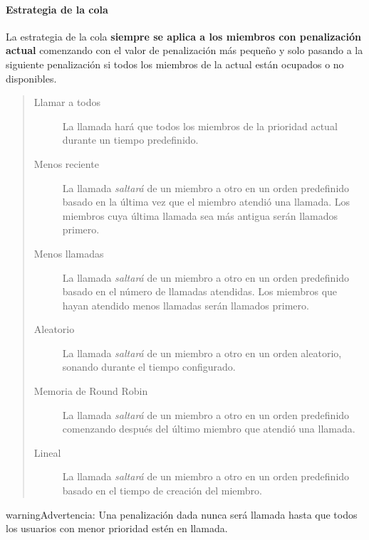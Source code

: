\documentclass[letterpaper,10pt,spanish]{sphinxmanual}
\begin{document}
\paragraph{Estrategia de la cola}
\label{administration_portal/client/vpbx/routing_endpoints/queues:queue-strategy}
La estrategia de la cola \textbf{siempre se aplica a los miembros con penalización actual} comenzando con el valor de penalización más pequeño y solo pasando a la siguiente penalización si todos los miembros de la actual están ocupados o no disponibles.
\begin{quote}
\begin{description}
\item[{Llamar a todos}] \leavevmode
La llamada hará que todos los miembros de la prioridad actual durante un tiempo predefinido.

\item[{Menos reciente}] \leavevmode
La llamada \emph{saltará} de un miembro a otro en un orden predefinido basado en la última vez que el miembro atendió una llamada. Los miembros cuya última llamada sea más antigua serán llamados primero.

\item[{Menos llamadas}] \leavevmode
La llamada \emph{saltará} de un miembro a otro en un orden predefinido basado en el número de llamadas atendidas. Los miembros que hayan atendido menos llamadas serán llamados primero.

\item[{Aleatorio}] \leavevmode
La llamada \emph{saltará} de un miembro a otro en un orden aleatorio, sonando durante el tiempo configurado.

\item[{Memoria de Round Robin}] \leavevmode
La llamada \emph{saltará} de un miembro a otro en un orden predefinido comenzando después del último miembro que atendió una llamada.

\item[{Lineal}] \leavevmode
La llamada \emph{saltará} de un miembro a otro en un orden predefinido basado en el tiempo de creación del miembro.

\end{description}
\end{quote}

\begin{notice}{warning}{Advertencia:}
Una penalización dada nunca será llamada hasta que todos los usuarios con menor prioridad estén en llamada.
\end{notice}
\end{document}
